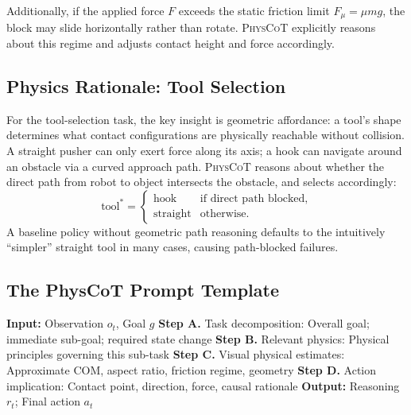 \documentclass{article}
\newcommand{\physcot}{\textsc{PhysCoT}}
\begin{document}
Additionally, if the applied force $F$ exceeds the static friction limit
$F_\mu = \mu m g$, the block may slide horizontally rather than rotate.
\physcot{} explicitly reasons about this regime and adjusts contact height
and force accordingly.

\subsection{Physics Rationale: Tool Selection}

For the tool-selection task, the key insight is geometric affordance:
a tool's shape determines what contact configurations are physically reachable
without collision.
A straight pusher can only exert force along its axis; a hook can navigate
around an obstacle via a curved approach path.
\physcot{} reasons about whether the direct path from robot to object
intersects the obstacle, and selects accordingly:
\begin{equation}
  \text{tool}^* =
  \begin{cases}
    \text{hook}     & \text{if direct path blocked},\\
    \text{straight} & \text{otherwise}.
  \end{cases}
  \label{eq:tool_select}
\end{equation}
A baseline policy without geometric path reasoning defaults to
the intuitively ``simpler'' straight tool in many cases,
causing path-blocked failures.

\subsection{The PhysCoT Prompt Template}

\begin{algorithm}[H]
\caption{\physcot{} Reasoning Template}
\label{alg:template}
\begin{algorithmic}
\STATE \textbf{Input:} Observation $o_t$, Goal $g$
\STATE \textbf{Step A.} Task decomposition:
\STATE \quad Overall goal; immediate sub-goal; required state change
\STATE \textbf{Step B.} Relevant physics:
\STATE \quad Physical principles governing this sub-task
\STATE \textbf{Step C.} Visual physical estimates:
\STATE \quad Approximate COM, aspect ratio, friction regime, geometry
\STATE \textbf{Step D.} Action implication:
\STATE \quad Contact point, direction, force, causal rationale
\STATE \textbf{Output:} Reasoning $r_t$; Final action $a_t$
\end{algorithmic}
\end{algorithm}
\end{document}
